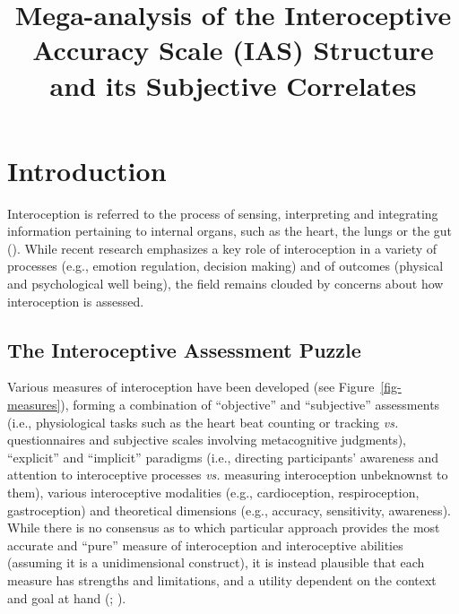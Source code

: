 \documentclass[
  jou,
  floatsintext,
  longtable,
  nolmodern,
  notxfonts,
  notimes,
  colorlinks=true,linkcolor=blue,citecolor=blue,urlcolor=blue]{apa7}
\title{Mega-analysis of the Interoceptive Accuracy Scale (IAS) Structure
and its Subjective Correlates}
\begin{document}
\maketitle



\setcounter{secnumdepth}{-\maxdimen} %

\setlength\LTleft{0pt}




\section{Introduction}\label{introduction}

Interoception is referred to the process of sensing, interpreting and
integrating information pertaining to internal organs, such as the
heart, the lungs or the gut
(). While
recent research emphasizes a key role of interoception in a variety of
processes (e.g., emotion regulation, decision making) and of outcomes
(physical and psychological well being), the field remains clouded by
concerns about how interoception is assessed.

\subsection{The Interoceptive Assessment
Puzzle}\label{the-interoceptive-assessment-puzzle}

Various measures of interoception have been developed (see
Figure~\ref{fig-measures}), forming a combination of ``objective'' and
``subjective'' assessments (i.e., physiological tasks such as the heart
beat counting or tracking \emph{vs.} questionnaires and subjective
scales involving metacognitive judgments), ``explicit'' and ``implicit''
paradigms (i.e., directing participants' awareness and attention to
interoceptive processes \emph{vs.} measuring interoception unbeknownst
to them), various interoceptive modalities (e.g., cardioception,
respiroception, gastroception) and theoretical dimensions (e.g.,
accuracy, sensitivity, awareness). While there is no consensus as to
which particular approach provides the most accurate and ``pure''
measure of interoception and interoceptive abilities (assuming it is a
unidimensional construct), it is instead plausible that each measure has
strengths and limitations, and a utility dependent on the context and
goal at hand (;
).
\end{document}
